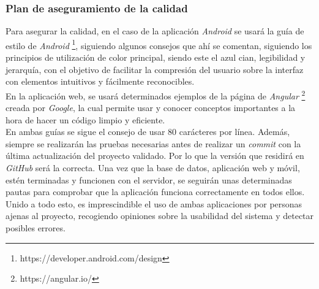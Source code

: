 \documentclass{article}
\begin{document}
\subsubsection{Plan de aseguramiento de la calidad}
Para asegurar la calidad, en el caso de la aplicación \textit{Android} se usará la guía de estilo de \textit{Android} \footnote{https://developer.android.com/design}, siguiendo algunos consejos que ahí se comentan, siguiendo los principios de utilización de color principal, siendo este el azul cian, legibilidad y jerarquía, con el objetivo de facilitar la compresión del usuario sobre la interfaz con elementos intuitivos y fácilmente reconocibles. \\
En la aplicación web, se usará determinados ejemplos de la página de \textit{Angular} \footnote{https://angular.io/} creada por \textit{Google}, la cual permite usar y conocer conceptos importantes a la hora de hacer un código limpio y eficiente.\\
En ambas guías se sigue el consejo de usar 80 carácteres por línea.
\hfill \break
Además, siempre se realizarán las pruebas necesarias antes de realizar un \textit{commit} con la última actualización del proyecto validado. Por lo que la versión que residirá en \textit{GitHub} será la correcta. 
\hfill \break
Una vez que la base de datos, aplicación web y móvil, estén terminadas y funcionen con el servidor, se seguirán unas determinadas pautas para comprobar que la aplicación funciona correctamente en todos ellos.  
Unido a todo esto, es imprescindible el uso de ambas aplicaciones por personas ajenas al proyecto, recogiendo opiniones sobre la usabilidad del sistema y detectar posibles errores. 
\end{document}
